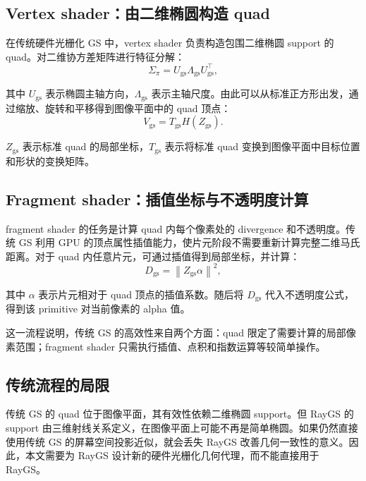 \documentclass[12pt,hyperref,a4paper,UTF8]{ctexart}
\begin{document}
\subsection{Vertex shader：由二维椭圆构造 quad}
在传统硬件光栅化 GS 中，vertex shader 负责构造包围二维椭圆 support 的 quad。对二维协方差矩阵进行特征分解：
\begin{equation}
\displaystyle
\Sigma_{\pi}
=
U_{\mathrm{gs}}\Lambda_{\mathrm{gs}}U_{\mathrm{gs}}^\top ,
\end{equation}

其中 $U_{\mathrm{gs}}$ 表示椭圆主轴方向，$\Lambda_{\mathrm{gs}}$ 表示主轴尺度。由此可以从标准正方形出发，通过缩放、旋转和平移得到图像平面中的 quad 顶点：
\begin{equation}
\displaystyle
V_{\mathrm{gs}}
=
T_{\mathrm{gs}}H(Z_{\mathrm{gs}}).
\end{equation}

$Z_{\mathrm{gs}}$ 表示标准 quad 的局部坐标，$T_{\mathrm{gs}}$ 表示将标准 quad 变换到图像平面中目标位置和形状的变换矩阵。



\subsection{Fragment shader：插值坐标与不透明度计算}
fragment shader 的任务是计算 quad 内每个像素处的 divergence 和不透明度。传统 GS 利用 GPU 的顶点属性插值能力，使片元阶段不需要重新计算完整二维马氏距离。对于 quad 内任意片元，可通过插值得到局部坐标，并计算：
\begin{equation}
\displaystyle
D_{\mathrm{gs}}
=
\left\| Z_{\mathrm{gs}}\alpha \right\|^2 ,
\end{equation}

其中 $\alpha$ 表示片元相对于 quad 顶点的插值系数。随后将 $D_{\mathrm{gs}}$ 代入不透明度公式，得到该 primitive 对当前像素的 alpha 值。

这一流程说明，传统 GS 的高效性来自两个方面：quad 限定了需要计算的局部像素范围；fragment shader 只需执行插值、点积和指数运算等较简单操作。



\subsection{传统流程的局限}
传统 GS 的 quad 位于图像平面，其有效性依赖二维椭圆 support。但 RayGS 的 support 由三维射线关系定义，在图像平面上可能不再是简单椭圆。如果仍然直接使用传统 GS 的屏幕空间投影近似，就会丢失 RayGS 改善几何一致性的意义。因此，本文需要为 RayGS 设计新的硬件光栅化几何代理，而不能直接用于 RayGS。
\end{document}
